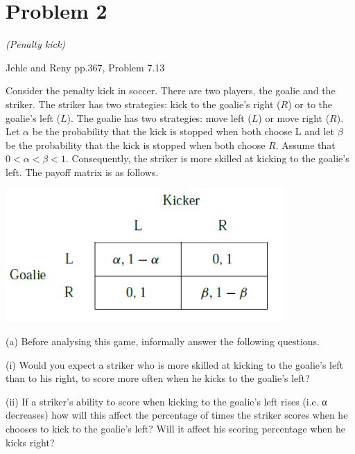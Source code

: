 \documentclass{article}
\begin{document}

\section{Problem 2} \textit{(Penalty kick)}

Jehle and Reny pp.367, Problem 7.13

Consider the penalty kick in soccer. There are two players, the goalie and the striker. The striker has
two strategies: kick to the goalie’s right ($R$) or to the goalie’s left ($L$). The goalie has two strategies:
move left ($L$) or move right ($R$). Let $\alpha$ be the probability that the kick is stopped when both choose
L and let $\beta$ be the probability that the kick is stopped when both choose $R$. Assume that $0 < \alpha <
\beta < 1$. Consequently, the striker is more skilled at kicking to the goalie’s left. The payoff matrix is
as follows.

\begin{center}
{\includegraphics[width=0.8\textwidth]{8.q7_13}
\label{fig:q7_13}
\vspace{2mm}}
\end{center}


(a) Before analysing this game, informally answer the following questions.

(i) Would you expect a striker who is more skilled at kicking to the goalie’s left than to his
right, to score more often when he kicks to the goalie’s left?

(ii) If a striker’s ability to score when kicking to the goalie’s left rises (i.e. α decreases) how will
this affect the percentage of times the striker scores when he chooses to kick to the goalie’s
left? Will it affect his scoring percentage when he kicks right?
\end{document}
